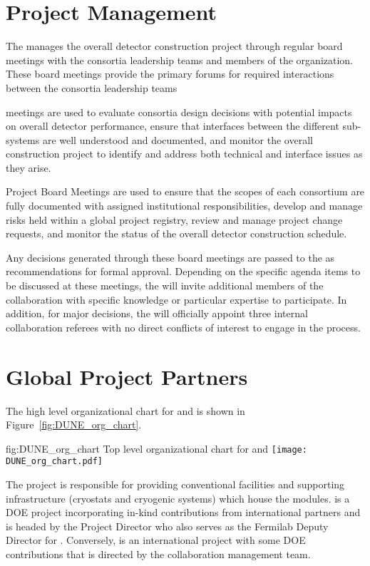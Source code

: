 \section{Project Management}
\label{sec:pm}

The  manages the overall detector construction
project through regular board meetings with the consortia leadership
teams and members of the  organization.  These
board meetings provide the primary forums for required interactions
between the consortia leadership teams

 meetings are used to evaluate consortia design
decisions with potential impacts on overall detector performance,
ensure that interfaces between the different sub-systems are well
understood and documented, and monitor the overall construction
project to identify and address both technical and interface issues as
they arise.

Project Board Meetings are used to ensure that the scopes of each
consortium are fully documented with assigned institutional
responsibilities, develop and manage risks held within a global
project registry, review and manage project change requests, and
monitor the status of the overall detector construction schedule.

Any decisions generated through these board meetings are passed to the
  as recommendations for formal approval.
Depending on the specific agenda items to be discussed at these
meetings, the  will invite additional members of
the collaboration with specific knowledge or particular expertise to
participate.  In addition, for major decisions, the 
will officially appoint three internal collaboration
referees with no direct conflicts of interest to engage in the
process.

\section{Global Project Partners}
\label{sec:partners}

The high level organizational chart for  and 
is shown in Figure~\ref{fig:DUNE_org_chart}.
\begin{dunefigure}{fig:DUNE_org_chart}
  {Top level organizational chart for  and }
  \texttt{[image: DUNE\_org\_chart.pdf]}
\end{dunefigure}
The  project is responsible for providing conventional
facilities and supporting infrastructure (cryostats and cryogenic
systems) which house the   modules.  is a  DOE
project incorporating in-kind contributions from international
partners and is headed by the  Project Director who also serves as
the Fermilab Deputy Director for .  Conversely,  is an
international project with some  DOE contributions that is
directed by the  collaboration management team.


